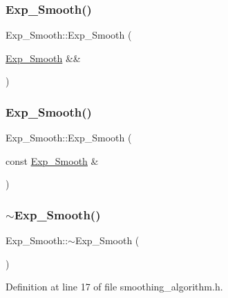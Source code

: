 \subsubsection{\texorpdfstring{Exp\_Smooth()}{Exp\_Smooth()}\hspace{0.1cm}{\footnotesize\ttfamily [3/4]}}
{\footnotesize\ttfamily Exp\+\_\+\+Smooth\+::\+Exp\+\_\+\+Smooth (\begin{DoxyParamCaption}\item[{\mbox{\hyperlink{class_exp___smooth}{Exp\+\_\+\+Smooth}} \&\&}]{ }\end{DoxyParamCaption})\hspace{0.3cm}{\ttfamily [default]}}

\mbox{\label{class_exp___smooth_ad21b2fa9537b68e1e6b7cc57cf1d0ce9}} 
\subsubsection{\texorpdfstring{Exp\_Smooth()}{Exp\_Smooth()}\hspace{0.1cm}{\footnotesize\ttfamily [4/4]}}
{\footnotesize\ttfamily Exp\+\_\+\+Smooth\+::\+Exp\+\_\+\+Smooth (\begin{DoxyParamCaption}\item[{const \mbox{\hyperlink{class_exp___smooth}{Exp\+\_\+\+Smooth}} \&}]{ }\end{DoxyParamCaption})\hspace{0.3cm}{\ttfamily [default]}}

\mbox{\label{class_exp___smooth_ae0c40c45c671cc5dfe6e8880acdbb2d8}} 
\subsubsection{\texorpdfstring{$\sim$Exp\_Smooth()}{~Exp\_Smooth()}}
{\footnotesize\ttfamily Exp\+\_\+\+Smooth\+::$\sim$\+Exp\+\_\+\+Smooth (\begin{DoxyParamCaption}{ }\end{DoxyParamCaption})\hspace{0.3cm}{\ttfamily [inline]}}



Definition at line 17 of file smoothing\+\_\+algorithm.\+h.



